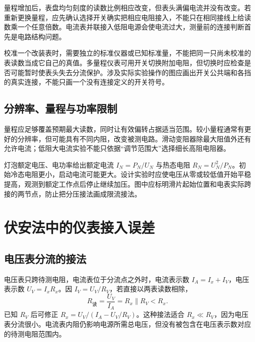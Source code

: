 量程增加后，表盘均匀刻度的读数比例相应改变，但表头满偏电流并没有改变。若重新更换量程，应先确认选择开关确实把相应电阻接入，不能只在相同接线上给读数乘一个任意倍数。电流表并联接入低阻电源会使电流过大，测量前的连接判断首先是电路结构问题。

校准一个改装表时，需要独立的标准仪器或已知标准量，不能把同一只尚未校准的表读数当成它自己的真值。多量程仪表可用开关切换附加电阻，但切换时应检查是否可能暂时使表头失去分流保护。涉及实际实验操作的图应画出开关公共端和各挡的真实连接，不能只画一个没有连接定义的开关符号。

\subsection{分辨率、量程与功率限制}

量程应足够覆盖预期最大读数，同时让有效偏转占据适当范围。较小量程通常有更好的分辨率，但可能具有不同内阻，改变被测电路。滑动变阻器除最大阻值外还有允许电流；低阻大电流实验不能只依据“调节范围大”选择细长高阻电阻器。

灯泡额定电压、电功率给出额定电流 $I_N=P_N/U_N$ 与热态电阻 $R_N=U_N^2/P_N$。初始冷态电阻更小，启动电流可能更大。设计实验时应使电压从零或较低值开始平稳提高，观测到额定工作点后停止继续加压。图中应标明滑片起始位置和电表实际跨接的两节点，防止把分压接法画成限流接法。


\section{伏安法中的仪表接入误差}
\subsection{电压表分流的接法}

电压表只跨待测电阻，电流表位于分流点之外时，电流表示数 $I_A=I_x+I_V$，电压表示数 $U_V=I_xR_x$。因 $I_V=U_V/R_V$，若直接以两表读数相除，
\[
 R_{\text{读}}=\frac{U_V}{I_A}=R_x\parallel R_V<R_x.
\]
已知 $R_V$ 后可修正 $R_x=U_V/(I_A-U_V/R_V)$。这种接法适合 $R_x\ll R_V$，因为电压表分流很小。电流表内阻仍影响电源所需总电压，但没有被包含在电压表示数对应的待测电阻范围内。

